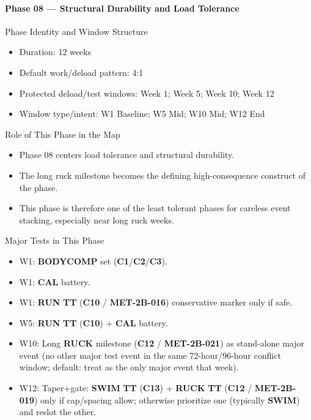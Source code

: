 \documentclass[10pt]{article}
\begin{document}
\newpage
\paragraph*{Phase 08 — Structural Durability and Load Tolerance}

Phase Identity and Window Structure

\begin{itemize}
\item Duration: 12 weeks
\item Default work/deload pattern: 4:1
\item Protected deload/test windows: Week 1; Week 5; Week 10; Week 12
\item Window type/intent: W1 Baseline; W5 Mid; W10 Mid; W12 End
\end{itemize}

Role of This Phase in the Map

\begin{itemize}
\item Phase 08 centers load tolerance and structural durability.
\item The long ruck milestone becomes the defining high-consequence construct of the phase.
\item This phase is therefore one of the least tolerant phases for careless event stacking, especially near long ruck weeks.
\end{itemize}

Major Tests in This Phase

\begin{itemize}
\item W1: \textbf{BODYCOMP} set (\textbf{C1}/\textbf{C2}/\textbf{C3}).
\item W1: \textbf{CAL} battery.
\item W1: \textbf{RUN} \textbf{TT} (\textbf{C10} / \textbf{MET-2B-016}) conservative marker only if safe.
\item W5: \textbf{RUN} \textbf{TT} (\textbf{C10}) + \textbf{CAL} battery.
\item W10: Long \textbf{RUCK} milestone (\textbf{C12} / \textbf{MET-2B-021}) as stand-alone major event (no other major test event in the same 72-hour/96-hour conflict window; default: treat as the only major event that week).
\item W12: Taper+gate: \textbf{SWIM} \textbf{TT} (\textbf{C13}) + \textbf{RUCK} \textbf{TT} (\textbf{C12} / \textbf{MET-2B-019}) only if cap/spacing allow; otherwise prioritize one (typically \textbf{SWIM}) and reslot the other.
\end{itemize}
\end{document}
